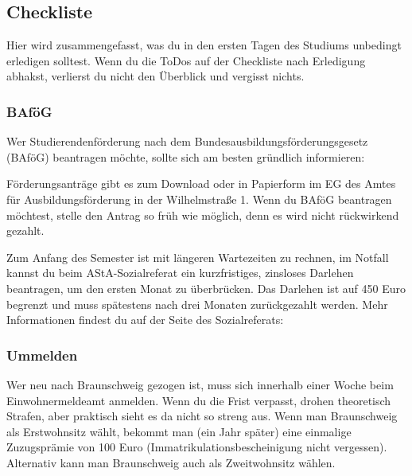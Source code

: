 
\subsection{Checkliste}
\label{checkliste}
	Hier wird zusammengefasst, was du in den ersten Tagen des Studiums unbedingt erledigen solltest. Wenn du die ToDos auf der Checkliste nach Erledigung abhakst, verlierst du nicht den Überblick und vergisst nichts.
	


\begin{multicols}{2}
\raggedcolumns

\subsubsection{BAföG}
	\label{todobafoeg}
	Wer Studierendenförderung nach dem Bundesausbildungsförderungsgesetz (BAföG) beantragen möchte, sollte sich am besten gründlich informieren: 
 
	Förderungsanträge gibt es zum Download oder in Papierform im EG des Amtes für Ausbildungsförderung in der Wilhelmstraße 1. Wenn du BAföG beantragen möchtest, stelle den Antrag so früh wie möglich, denn es wird nicht rückwirkend gezahlt.

	Zum Anfang des Semester ist mit längeren Wartezeiten zu rechnen, im Notfall kannst du beim AStA-Sozialreferat ein kurzfristiges, zinsloses Darlehen beantragen, um den ersten Monat zu überbrücken. Das Darlehen ist auf 450 Euro begrenzt und muss spätestens nach drei Monaten zurückgezahlt werden. Mehr Informationen findest du auf der Seite des Sozialreferats: 


\subsubsection{Ummelden}
	\label{todoummelden}

	Wer neu nach Braunschweig gezogen ist, muss sich innerhalb einer Woche beim Einwohnermeldeamt anmelden. Wenn du die Frist verpasst, drohen theoretisch Strafen, aber praktisch sieht es da nicht so streng aus. Wenn man Braunschweig als Erstwohnsitz wählt, bekommt man (ein Jahr später) eine einmalige Zuzugsprämie von 100 Euro (Immatrikulationsbescheinigung nicht vergessen). Alternativ kann man Braunschweig auch als Zweitwohnsitz wählen.


\end{multicols}
